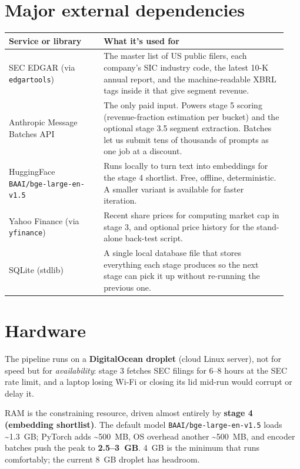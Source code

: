 \documentclass[11pt,a4paper,oneside]{article}
\begin{document}
\section{Major external dependencies}

\begin{center}
\begin{tabular}{@{}p{0.32\linewidth} p{0.62\linewidth}@{}}
\toprule
\textbf{Service or library} & \textbf{What it's used for} \\
\midrule
SEC EDGAR (via \texttt{edgartools}) & The master list of US public filers, each company's SIC industry code, the latest 10-K annual report, and the machine-readable XBRL tags inside it that give segment revenue. \\
Anthropic Message Batches API & The only paid input. Powers stage 5 scoring (revenue-fraction estimation per bucket) and the optional stage 3.5 segment extraction. Batches let us submit tens of thousands of prompts as one job at a discount. \\
HuggingFace \texttt{BAAI/bge-large-en-v1.5} & Runs locally to turn text into embeddings for the stage 4 shortlist. Free, offline, deterministic. A smaller variant is available for faster iteration. \\
Yahoo Finance (via \texttt{yfinance}) & Recent share prices for computing market cap in stage 3, and optional price history for the stand-alone back-test script. \\
SQLite (stdlib) & A single local database file that stores everything each stage produces so the next stage can pick it up without re-running the previous one. \\
\bottomrule
\end{tabular}
\end{center}

\section{Hardware}

The pipeline runs on a \textbf{DigitalOcean droplet} (cloud Linux server), not for speed but for \emph{availability}: stage 3 fetches SEC filings for 6--8 hours at the SEC rate limit, and a laptop losing Wi-Fi or closing its lid mid-run would corrupt or delay it.

RAM is the constraining resource, driven almost entirely by \textbf{stage 4 (embedding shortlist)}. The default model \texttt{BAAI/bge-large-en-v1.5} loads \textasciitilde 1.3~GB; PyTorch adds \textasciitilde 500~MB, OS overhead another \textasciitilde 500~MB, and encoder batches push the peak to \textbf{2.5--3~GB}. 4~GB is the minimum that runs comfortably; the current 8~GB droplet has headroom.
\end{document}
